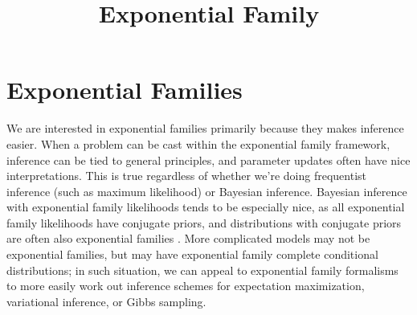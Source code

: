 \documentclass{article} %
\begin{document}
\title{Exponential Family} 

\maketitle
\tableofcontents
\newpage 

\section{Exponential Families} \label{sec:ef}

We are interested in  exponential families primarily because they makes inference easier.   When a problem can be cast within the exponential family framework,  inference can be tied to general principles,  and parameter updates often have nice interpretations.    This is true regardless of whether we're doing frequentist inference (such as maximum likelihood) or Bayesian inference.    Bayesian inference with exponential family likelihoods tends to be especially nice,  as all exponential family likelihoods have conjugate priors,  and distributions with conjugate priors are often also exponential families \cite{bernardo2009bayesian}.    More complicated models may not be exponential families,  but may have exponential family complete conditional distributions;  in such situation,  we can appeal to exponential family formalisms to more easily work out inference schemes for expectation maximization,  variational inference,  or Gibbs sampling.   
\end{document}
